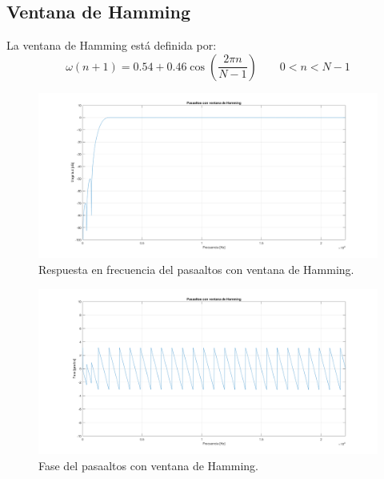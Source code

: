 \subsection{Ventana de Hamming}
La ventana de Hamming está definida por:
\begin{equation}
    \omega (n+1)=0.54+0.46\cos\left(\frac{2\pi n}{N-1} \right)  \qquad  0<n<N-1
\end{equation}
\begin{figure}[H]
  \includegraphics[scale=.35]{./images/1/hammingmod.png}
  \caption{Respuesta en frecuencia del pasaaltos con ventana de Hamming.}
\end{figure}
\begin{figure}[H]
  \includegraphics[scale=.35]{./images/1/hammingfase.png}
  \caption{Fase del pasaaltos con ventana de Hamming.}
\end{figure}

